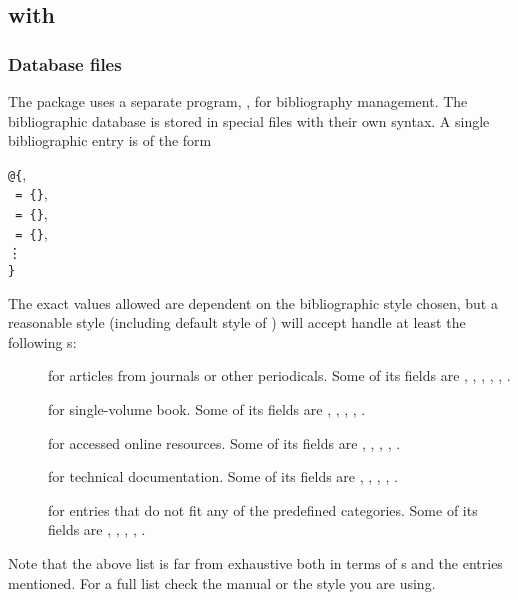 \subsection{ with }

\subsubsection{Database files}
The  package uses a separate program, , for
bibliography management. The bibliographic database is stored in special
 files with their own syntax. A single bibliographic entry is of the
form
\begin{lscommand}
\texttt{@}\texttt{\{},\\
\hspace*{1em}\texttt{ = \{}\texttt{\}},\\
\hspace*{1em}\texttt{ = \{}\texttt{\}},\\
\hspace*{1em}\texttt{ = \{}\texttt{\}},\\
\hspace*{3em}\vdots\\
\texttt{\}}
\end{lscommand}
The exact values allowed are dependent on the bibliographic style chosen, but a
reasonable style (including default style of ) will accept handle
at least the following s:
\begin{description}
  \item[] for articles from journals or other periodicals. Some
  of its fields are , , ,
  , , .
  \item[] for single-volume book. Some of its fields are
  , , , ,
  .
  \item[] for accessed online resources. Some of its fields are
   , , , , .
  \item[] for technical documentation. Some of its fields are
   , , , , .
  \item[] for entries that do not fit any of the predefined
   categories. Some of its fields are , ,
   , , .
\end{description}
Note that the above list is far from exhaustive both in terms of s and the entries mentioned. For a full list check the 
manual or the style you are using.

